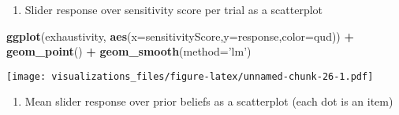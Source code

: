 \documentclass[]{article}
\newenvironment{Shaded}{\begin{snugshade}}{\end{snugshade}}
\newcommand{\KeywordTok}[1]{\textcolor[rgb]{0.13,0.29,0.53}{\textbf{#1}}}
\newcommand{\DataTypeTok}[1]{\textcolor[rgb]{0.13,0.29,0.53}{#1}}
\newcommand{\StringTok}[1]{\textcolor[rgb]{0.31,0.60,0.02}{#1}}
\newcommand{\OperatorTok}[1]{\textcolor[rgb]{0.81,0.36,0.00}{\textbf{#1}}}
\newcommand{\NormalTok}[1]{#1}
\providecommand{\tightlist}{%
  \setlength{\itemsep}{0pt}\setlength{\parskip}{0pt}}
\begin{document}
\begin{enumerate}
\def\labelenumi{\arabic{enumi}.}
\setcounter{enumi}{15}
\tightlist
\item
  Slider response over sensitivity score per trial as a scatterplot
\end{enumerate}

\begin{Shaded}
\begin{Highlighting}[]
\KeywordTok{ggplot}\NormalTok{(exhaustivity, }\KeywordTok{aes}\NormalTok{(}\DataTypeTok{x=}\NormalTok{sensitivityScore,}\DataTypeTok{y=}\NormalTok{response,}\DataTypeTok{color=}\NormalTok{qud)) }\OperatorTok{+}
\StringTok{  }\KeywordTok{geom_point}\NormalTok{() }\OperatorTok{+}
\StringTok{  }\KeywordTok{geom_smooth}\NormalTok{(}\DataTypeTok{method=}\StringTok{'lm'}\NormalTok{)}
\end{Highlighting}
\end{Shaded}

\texttt{[image: visualizations\_files/figure-latex/unnamed-chunk-26-1.pdf]}

\begin{enumerate}
\def\labelenumi{\arabic{enumi}.}
\setcounter{enumi}{16}
\tightlist
\item
  Mean slider response over prior beliefs as a scatterplot (each dot is
  an item)
\end{enumerate}

\begin{Shaded}
\end{Shaded}
\end{document}
